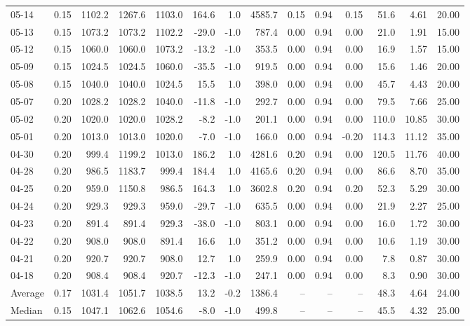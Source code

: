 \begin{threeparttable}
{\begin{tabular}{lrrrrrrrrrrrrr}
05-14 & 0.15 & 1102.2 & 1267.6 & 1103.0 & 164.6 & 1.0 & 4585.7 & 0.15 & 0.94 & 0.15 & 51.6 & 4.61 & 20.00 \\
05-13 & 0.15 & 1073.2 & 1073.2 & 1102.2 & -29.0 & -1.0 & 787.4 & 0.00 & 0.94 & 0.00 & 21.0 & 1.91 & 15.00 \\
05-12 & 0.15 & 1060.0 & 1060.0 & 1073.2 & -13.2 & -1.0 & 353.5 & 0.00 & 0.94 & 0.00 & 16.9 & 1.57 & 15.00 \\
05-09 & 0.15 & 1024.5 & 1024.5 & 1060.0 & -35.5 & -1.0 & 919.5 & 0.00 & 0.94 & 0.00 & 15.6 & 1.46 & 20.00 \\
05-08 & 0.15 & 1040.0 & 1040.0 & 1024.5 & 15.5 & 1.0 & 398.0 & 0.00 & 0.94 & 0.00 & 45.7 & 4.43 & 20.00 \\
05-07 & 0.20 & 1028.2 & 1028.2 & 1040.0 & -11.8 & -1.0 & 292.7 & 0.00 & 0.94 & 0.00 & 79.5 & 7.66 & 25.00 \\
05-02 & 0.20 & 1020.0 & 1020.0 & 1028.2 & -8.2 & -1.0 & 201.1 & 0.00 & 0.94 & 0.00 & 110.0 & 10.85 & 30.00 \\
05-01 & 0.20 & 1013.0 & 1013.0 & 1020.0 & -7.0 & -1.0 & 166.0 & 0.00 & 0.94 & -0.20 & 114.3 & 11.12 & 35.00 \\
04-30 & 0.20 & 999.4 & 1199.2 & 1013.0 & 186.2 & 1.0 & 4281.6 & 0.20 & 0.94 & 0.00 & 120.5 & 11.76 & 40.00 \\
04-28 & 0.20 & 986.5 & 1183.7 & 999.4 & 184.4 & 1.0 & 4165.6 & 0.20 & 0.94 & 0.00 & 86.6 & 8.70 & 35.00 \\
04-25 & 0.20 & 959.0 & 1150.8 & 986.5 & 164.3 & 1.0 & 3602.8 & 0.20 & 0.94 & 0.20 & 52.3 & 5.29 & 30.00 \\
04-24 & 0.20 & 929.3 & 929.3 & 959.0 & -29.7 & -1.0 & 635.5 & 0.00 & 0.94 & 0.00 & 21.9 & 2.27 & 25.00 \\
04-23 & 0.20 & 891.4 & 891.4 & 929.3 & -38.0 & -1.0 & 803.1 & 0.00 & 0.94 & 0.00 & 16.0 & 1.72 & 30.00 \\
04-22 & 0.20 & 908.0 & 908.0 & 891.4 & 16.6 & 1.0 & 351.2 & 0.00 & 0.94 & 0.00 & 10.6 & 1.19 & 30.00 \\
04-21 & 0.20 & 920.7 & 920.7 & 908.0 & 12.7 & 1.0 & 259.9 & 0.00 & 0.94 & 0.00 & 7.8 & 0.87 & 30.00 \\
04-18 & 0.20 & 908.4 & 908.4 & 920.7 & -12.3 & -1.0 & 247.1 & 0.00 & 0.94 & 0.00 & 8.3 & 0.90 & 30.00 \\
Average & 0.17 & 1031.4 & 1051.7 & 1038.5 & 13.2 & -0.2 & 1386.4 & -- & -- & -- & 48.3 & 4.64 & 24.00 \\
Median & 0.15 & 1047.1 & 1062.6 & 1054.6 & -8.0 & -1.0 & 499.8 & -- & -- & -- & 45.5 & 4.32 & 25.00 \\

\end{tabular}}
\end{threeparttable}
